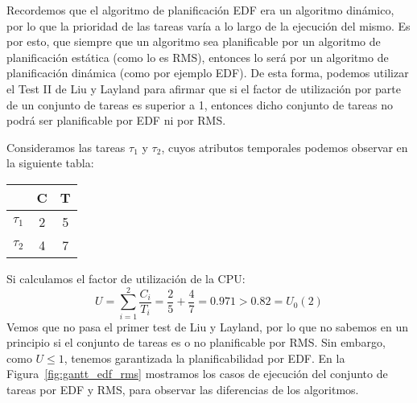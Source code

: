 Recordemos que el algoritmo de planificación EDF era un algoritmo dinámico, por lo que la prioridad de las tareas varía a lo largo de la ejecución del mismo. Es por esto, que siempre que un algoritmo sea planificable por un algoritmo de planificación estática (como lo es RMS), entonces lo será por un algoritmo de planificación dinámica (como por ejemplo EDF). De esta forma, podemos utilizar el Test II de Liu y Layland para afirmar que si el factor de utilización por parte de un conjunto de tareas es superior a 1, entonces dicho conjunto de tareas no podrá ser planificable por EDF ni por RMS\@.

\begin{ejemplo}
    Consideramos las tareas $\tau_1$ y $\tau_2$, cuyos atributos temporales podemos observar en la siguiente tabla:
    \begin{table}[H]
    \centering
    \begin{tabular}{|c|c|c|}
        \hline
        & C & T \\
        \hline
        $\tau_1$ & 2 & 5 \\
        \hline
        $\tau_2$ & 4 & 7 \\
        \hline
    \end{tabular}
    \end{table}
    Si calculamos el factor de utilización de la CPU:
    \begin{equation*}
        U = \sum_{i=1}^{2} \dfrac{C_i}{T_i} = \dfrac{2}{5} + \dfrac{4}{7} = 0.971 > 0.82 = U_0(2)
    \end{equation*}
    Vemos que no pasa el primer test de Liu y Layland, por lo que no sabemos en un principio si el conjunto de tareas es o no planificable por RMS\@. Sin embargo, como $U\leq 1$, tenemos garantizada la planificabilidad por EDF\@. En la Figura~\ref{fig:gantt_edf_rms} mostramos los casos de ejecución del conjunto de tareas por EDF y RMS, para observar las diferencias de los algoritmos.
    \begin{figure}[H]
        \centering
\end{figure}
\end{ejemplo}
